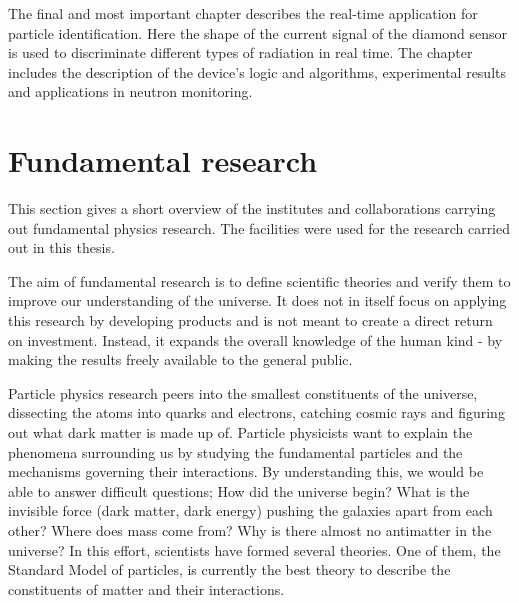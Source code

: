 The final and most important chapter describes the real-time application for particle identification. Here the shape of the current signal of the diamond sensor is used to discriminate different types of radiation in real time. The chapter includes the description of the device's logic and algorithms, experimental results and applications in neutron monitoring.


 




\clearpage
\section{Fundamental research}
\label{sec:fundphy}
This section gives a short overview of the institutes and collaborations carrying out fundamental physics research. The facilities were used for the research carried out in this thesis. 

The aim of fundamental research is to define scientific theories and verify them to improve our understanding of the universe. It does not in itself focus on applying this research by developing products and is not meant to create a direct return on investment. Instead, it expands the overall knowledge of the human kind - by making the results freely available to the general public.

Particle physics research peers into the smallest constituents of the universe, dissecting the atoms into quarks and electrons, catching cosmic rays and figuring out what dark matter is made up of. Particle physicists want to explain the phenomena surrounding us by studying the fundamental particles and the mechanisms governing their interactions. By understanding this, we would be able to answer difficult questions; How did the universe begin? What is the invisible force (dark matter, dark energy) pushing the galaxies apart from each other? Where does mass come from? Why is there almost no antimatter in the universe? In this effort, scientists have formed several theories. One of them, the Standard Model of particles, is currently the best theory to describe the constituents of matter and their interactions.

